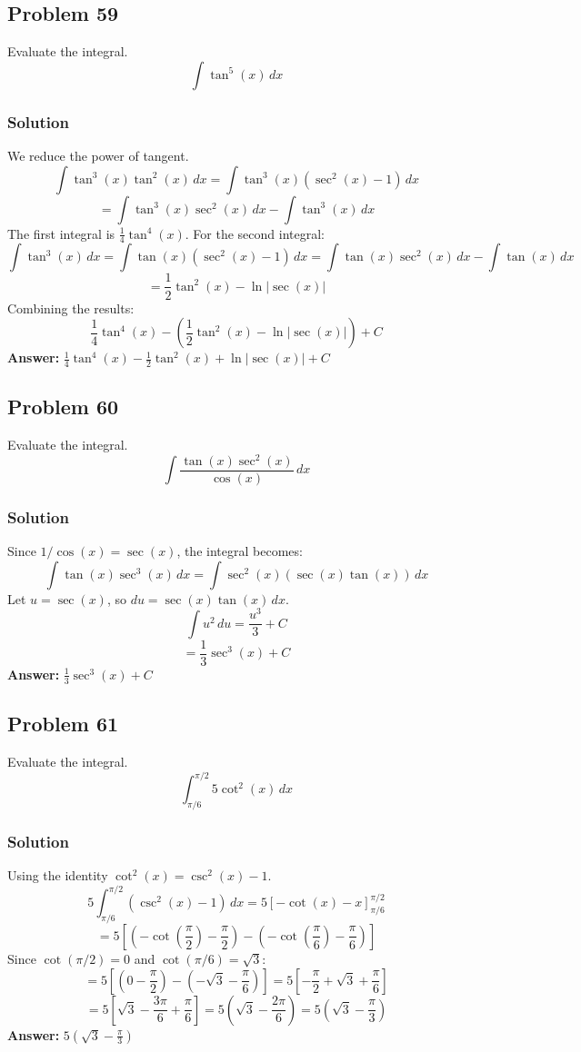 \documentclass{article}
\begin{document}
\subsection{Problem 59}
Evaluate the integral.
$$ \int \tan^5(x) \,dx $$
\subsubsection*{Solution}
We reduce the power of tangent.
$$ \int \tan^3(x) \tan^2(x) \,dx = \int \tan^3(x) (\sec^2(x) - 1) \,dx $$
$$ = \int \tan^3(x)\sec^2(x) \,dx - \int \tan^3(x) \,dx $$
The first integral is $\frac{1}{4}\tan^4(x)$. For the second integral:
$$ \int \tan^3(x) \,dx = \int \tan(x)(\sec^2(x)-1) \,dx = \int \tan(x)\sec^2(x) \,dx - \int \tan(x) \,dx $$
$$ = \frac{1}{2}\tan^2(x) - \ln|\sec(x)| $$
Combining the results:
$$ \frac{1}{4}\tan^4(x) - \left( \frac{1}{2}\tan^2(x) - \ln|\sec(x)| \right) + C $$
\textbf{Answer:} $ \frac{1}{4}\tan^4(x) - \frac{1}{2}\tan^2(x) + \ln|\sec(x)| + C $
\subsection{Problem 60}
Evaluate the integral.
$$ \int \frac{\tan(x) \sec^2(x)}{\cos(x)} \,dx $$
\subsubsection*{Solution}
Since $1/\cos(x) = \sec(x)$, the integral becomes:
$$ \int \tan(x) \sec^3(x) \,dx = \int \sec^2(x) (\sec(x)\tan(x)) \,dx $$
Let $u = \sec(x)$, so $du = \sec(x)\tan(x) \,dx$.
$$ \int u^2 \,du = \frac{u^3}{3} + C $$
$$ = \frac{1}{3}\sec^3(x) + C $$
\textbf{Answer:} $ \frac{1}{3}\sec^3(x) + C $
\subsection{Problem 61}
Evaluate the integral.
$$ \int_{\pi/6}^{\pi/2} 5 \cot^2(x) \,dx $$
\subsubsection*{Solution}
Using the identity $\cot^2(x) = \csc^2(x) - 1$.
$$ 5 \int_{\pi/6}^{\pi/2} (\csc^2(x) - 1) \,dx = 5 \left[ -\cot(x) - x \right]_{\pi/6}^{\pi/2} $$
$$ = 5 \left[ (-\cot(\frac{\pi}{2}) - \frac{\pi}{2}) - (-\cot(\frac{\pi}{6}) - \frac{\pi}{6}) \right] $$
Since $\cot(\pi/2) = 0$ and $\cot(\pi/6) = \sqrt{3}$:
$$ = 5 \left[ (0 - \frac{\pi}{2}) - (-\sqrt{3} - \frac{\pi}{6}) \right] = 5 \left[ -\frac{\pi}{2} + \sqrt{3} + \frac{\pi}{6} \right] $$
$$ = 5 \left[ \sqrt{3} - \frac{3\pi}{6} + \frac{\pi}{6} \right] = 5 \left( \sqrt{3} - \frac{2\pi}{6} \right) = 5\left(\sqrt{3} - \frac{\pi}{3}\right) $$
\textbf{Answer:} $ 5\left(\sqrt{3} - \frac{\pi}{3}\right) $
\end{document}

